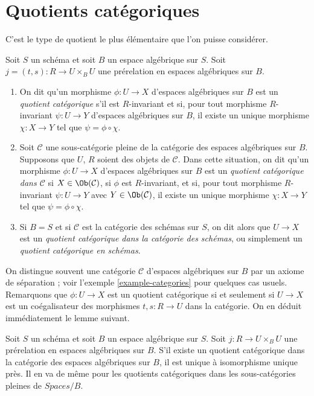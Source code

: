 \section{Quotients catégoriques}
\label{section-categorical}

\noindent
C'est le type de quotient le plus élémentaire que l'on puisse considérer.

\begin{definition}
\label{definition-categorical}
Soit $S$ un schéma et soit $B$ un espace algébrique sur $S$.
Soit $j = (t, s) : R \to U \times_B U$ une prérelation en espaces algébriques
sur $B$.
\begin{enumerate}
\item On dit qu'un morphisme $\phi : U \to X$ d'espaces algébriques sur $B$
est un {\it quotient catégorique} s'il est $R$-invariant et si,
pour tout morphisme $R$-invariant $\psi : U \to Y$ d'espaces algébriques sur $B$,
il existe un unique morphisme $\chi : X \to Y$ tel que
$\psi = \phi \circ \chi$.
\item Soit $\mathcal{C}$ une sous-catégorie pleine de la catégorie des espaces
algébriques sur $B$. Supposons que $U$, $R$ soient des objets de $\mathcal{C}$.
Dans cette situation, on dit
qu'un morphisme $\phi : U \to X$ d'espaces algébriques sur $B$
est un {\it quotient catégorique dans $\mathcal{C}$}
si $X \in \Ob(\mathcal{C})$, si $\phi$ est $R$-invariant,
et si, pour tout morphisme $R$-invariant
$\psi : U \to Y$ avec $Y \in \Ob(\mathcal{C})$,
il existe un unique morphisme $\chi : X \to Y$ tel
que $\psi = \phi \circ \chi$.
\item Si $B = S$ et si $\mathcal{C}$ est la catégorie des schémas sur $S$,
on dit alors que $U \to X$ est un
{\it quotient catégorique dans la catégorie des schémas}, ou simplement un
{\it quotient catégorique en schémas}.
\end{enumerate}
\end{definition}

\noindent
On distingue souvent une catégorie $\mathcal{C}$ d'espaces algébriques sur $B$
par un axiome de séparation ; voir
l'exemple \ref{example-categories}
pour quelques cas usuels.
Remarquons que $\phi : U \to X$ est un quotient catégorique si et seulement
si $U \to X$ est un coégalisateur des
morphismes $t, s : R \to U$ dans la catégorie. On en déduit immédiatement
le lemme suivant.

\begin{lemma}
\label{lemma-categorical-unique}
Soit $S$ un schéma et soit $B$ un espace algébrique sur $S$.
Soit $j : R \to U \times_B U$ une prérelation en espaces algébriques sur $B$.
S'il existe un quotient catégorique dans la catégorie des espaces algébriques
sur $B$, il est unique à isomorphisme unique près.
Il en va de même pour les quotients catégoriques dans les sous-catégories pleines de
$\textit{Spaces}/B$.
\end{lemma}

